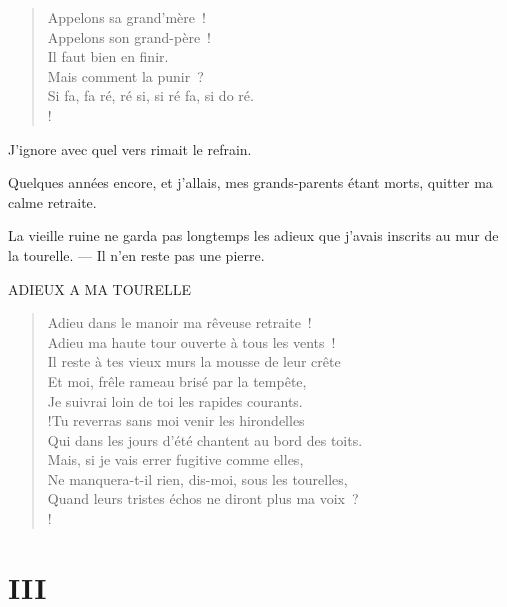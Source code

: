 \documentclass[french,twoside]{book} %
\newenvironment{quoteblock}%
  {\begin{quoting}}
  {\end{quoting}}
\newcommand\chapteropen{} %
\newcommand\chapterclose{} %
\newenvironment{quotebar}{%
    \def\FrameCommand{{\color{rubric!10!}\vrule width 0.5em} \hspace{0.9em}}%
    \def\OuterFrameSep{\itemsep} %
    \MakeFramed {\advance\hsize-\width \FrameRestore}
  }%
  {%
    \endMakeFramed
  }
\renewenvironment{quoteblock}%
  {%
    \savenotes
    \setstretch{0.9}
    \normalfont
    \begin{quotebar}
  }
  {%
    \end{quotebar}
    \spewnotes
  }
\begin{document}
\begin{verse}
\hspace{1em}Appelons sa grand’mère !\\
\hspace{1em}Appelons son grand-père !\\
\hspace{1em}Il faut bien en finir.\\
\hspace{1em}Mais comment la punir ?\\
Si fa, fa ré, ré si, si ré fa, si do ré.\\!
\end{verse}

\noindent J’ignore avec quel vers rimait le refrain.\par
Quelques années encore, et j’allais, mes grands-parents étant morts, quitter ma calme retraite.\par
La vieille ruine ne garda pas longtemps les adieux que j’avais inscrits au mur de la tourelle. — Il n’en reste pas une pierre.\par

\begin{quoteblock}
ADIEUX A MA TOURELLE\end{quoteblock}

\begin{verse}
Adieu dans le manoir ma rêveuse retraite !\\
Adieu ma haute tour ouverte à tous les vents !\\
Il reste à tes vieux murs la mousse de leur crête\\
Et moi, frêle rameau brisé par la tempête,\\
Je suivrai loin de toi les rapides courants.\\!Tu reverras sans moi venir les hirondelles\\
Qui dans les jours d’été chantent au bord des toits.\\
Mais, si je vais errer fugitive comme elles,\\
Ne manquera-t-il rien, dis-moi, sous les tourelles,\\
Quand leurs tristes échos ne diront plus ma voix ?\\!
\end{verse}

\chapterclose


\chapteropen
 \chapter[{III}]{III}
\label{p1.3}
\end{document}
